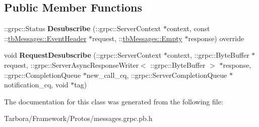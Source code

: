 \subsection*{Public Member Functions}
\begin{DoxyCompactItemize}
\item 
\mbox{\label{classtbMessages_1_1TarboraMessages_1_1WithRawMethod__Desubscribe_a5074cf2a41886bfd9d5ecbcb3fdbe820}} 
\+::grpc\+::\+Status {\bfseries Desubscribe} (\+::grpc\+::\+Server\+Context $\ast$context, const \+::\hyperlink{classtbMessages_1_1EventHeader}{tb\+Messages\+::\+Event\+Header} $\ast$request, \+::\hyperlink{classtbMessages_1_1Empty}{tb\+Messages\+::\+Empty} $\ast$response) override
\item 
\mbox{\label{classtbMessages_1_1TarboraMessages_1_1WithRawMethod__Desubscribe_a61fc882924af4f68b742c4ad8c98747e}} 
void {\bfseries Request\+Desubscribe} (\+::grpc\+::\+Server\+Context $\ast$context, \+::grpc\+::\+Byte\+Buffer $\ast$request, \+::grpc\+::\+Server\+Async\+Response\+Writer$<$ \+::grpc\+::\+Byte\+Buffer $>$ $\ast$response, \+::grpc\+::\+Completion\+Queue $\ast$new\+\_\+call\+\_\+cq, \+::grpc\+::\+Server\+Completion\+Queue $\ast$notification\+\_\+cq, void $\ast$tag)
\end{DoxyCompactItemize}


The documentation for this class was generated from the following file\+:\begin{DoxyCompactItemize}
\item 
Tarbora/\+Framework/\+Protos/messages.\+grpc.\+pb.\+h\end{DoxyCompactItemize}
